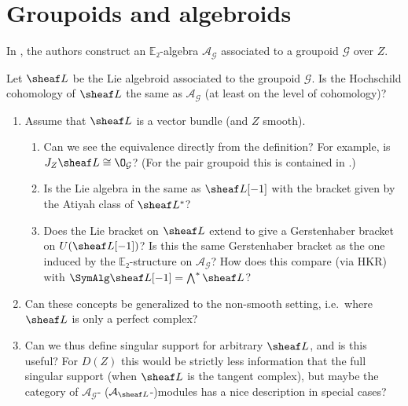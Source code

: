 \documentclass[english,no-theorem-numbers]{short-notes}
\begin{document}
\section{Groupoids and algebroids}

In \cite[Section~F.4]{ArinkinGaitsgory:arXiv:v2:SingularSupport}, the authors construct an $\mathbb E₂$-algebra $\mathcal A_{\mathcal G}$ associated to a groupoid $\mathcal G$ over $Z$.

\begin{Question}
    Let $\sheaf L$ be the Lie algebroid associated to the groupoid $\mathcal G$.
    Is the Hochschild cohomology of $\sheaf L$ the same as $\mathcal A_{\mathcal G}$ (at least on the level of cohomology)?
\end{Question}

\begin{enumerate}
    \item Assume that $\sheaf L$ is a vector bundle (and $Z$ smooth).
        \begin{enumerate}
            \item
                Can we see the equivalence directly from the definition?
                For example, is $J_Z\sheaf L \cong \O_{\mathcal G}$?
                (For the pair groupoid this is contained in \cite[Proposition~6.1]{CalaqueRossiVanDenBergh:2010:HochschildCoHomlogyForLieAlgebroids}.)
            \item
                Is the Lie algebra in \cite[Proposition G.1.7]{ArinkinGaitsgory:arXiv:v2:SingularSupport} the same as $\sheaf L[-1]$ with the bracket given by the Atiyah class of $\sheaf L^*$?
            \item
                Does the Lie bracket on $\sheaf L$ extend to give a Gerstenhaber bracket on $U(\sheaf L[-1])$?
                Is this the same Gerstenhaber bracket as the one induced by the $\mathbb E₂$-structure on $\mathcal A_{\mathcal G}$?
                How does this compare (via HKR) with $\SymAlg \sheaf L[-1] = \bigwedge^\ast \sheaf L$?
        \end{enumerate}
    \item Can these concepts be generalized to the non-smooth setting, i.e.~where $\sheaf L$ is only a perfect complex?
    \item Can we thus define singular support for arbitrary $\sheaf L$, and is this useful?
        For $D(Z)$ this would be strictly less information that the full singular support (when $\sheaf L$ is the tangent complex), but maybe the category of $\mathcal A_{\mathcal G}$- ($\mathcal A_{\sheaf L}$-)modules has a nice description in special cases?
\end{enumerate}

\printbibliography
\end{document}
